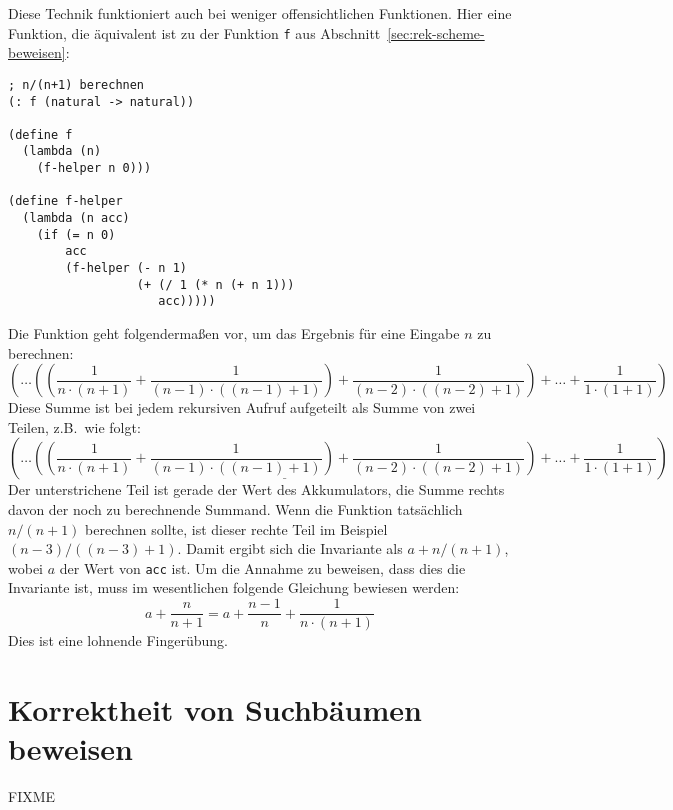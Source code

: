 %
Diese Technik funktioniert auch bei weniger offensichtlichen
Funktionen.  Hier eine Funktion, die äquivalent ist zu der Funktion
\lstinline{f} aus Abschnitt~\ref{sec:rek-scheme-beweisen}:

\begin{lstlisting}
; n/(n+1) berechnen
(: f (natural -> natural))

(define f
  (lambda (n)
    (f-helper n 0)))

(define f-helper
  (lambda (n acc)
    (if (= n 0)
        acc
        (f-helper (- n 1)
                  (+ (/ 1 (* n (+ n 1)))
                     acc)))))
\end{lstlisting}
%
Die Funktion geht folgendermaßen vor, um das Ergebnis für eine Eingabe
$n$ zu berechnen:
%
\begin{displaymath}
  (\ldots ((\frac{1}{n \cdot (n + 1)}
  + \frac{1}{(n - 1) \cdot ((n - 1) + 1)})
  + \frac{1}{(n - 2) \cdot ((n - 2) + 1)})
  + \ldots
  + \frac{1}{1 \cdot (1 + 1)})
\end{displaymath}
%
Diese Summe ist bei jedem rekursiven Aufruf aufgeteilt als Summe von
zwei Teilen, z.B.\ wie folgt:
%
\begin{displaymath}
  (\ldots \underline{((\frac{1}{n \cdot (n + 1)}
  + \frac{1}{(n - 1) \cdot ((n - 1) + 1)})
  + \frac{1}{(n - 2) \cdot ((n - 2) + 1)})}
  + \ldots
  + \frac{1}{1 \cdot (1 + 1)})
\end{displaymath}
%
Der unterstrichene Teil ist gerade der Wert des Akkumulators, die
Summe rechts davon der noch zu berechnende Summand.  
Wenn die Funktion tatsächlich $n/(n+1)$ berechnen sollte, ist dieser
rechte Teil im Beispiel $(n-3)/((n-3)+1)$.  Damit ergibt
sich die Invariante als $a + n/(n+1)$, wobei $a$ der Wert von
\lstinline{acc} ist.  Um die Annahme zu beweisen, dass dies die Invariante
ist, muss im wesentlichen folgende Gleichung bewiesen werden:
\[a+ \frac{n}{n+1} = a + \frac{n-1}{n} + \frac{1}{n\cdot (n+1)}\]
Dies ist eine lohnende Fingerübung.

\section{Korrektheit von Suchbäumen beweisen}

FIXME

